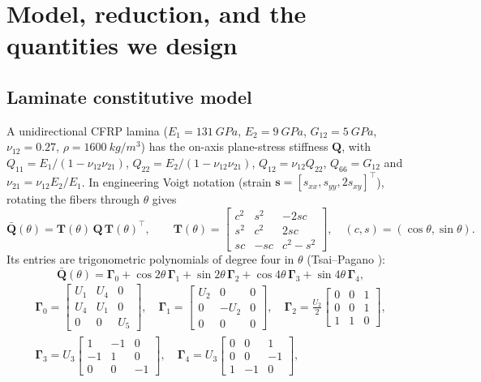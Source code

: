 \section{Model, reduction, and the quantities we design}\label{sec:model}

\subsection{Laminate constitutive model}\label{sec:clt}
A unidirectional CFRP lamina ($E_1=\SI{131}{GPa}$, $E_2=\SI{9}{GPa}$,
$G_{12}=\SI{5}{GPa}$, $\nu_{12}=0.27$, $\rho=\SI{1600}{kg/m^3}$) has the on-axis
plane-stress stiffness $\bm Q$, with $Q_{11}=E_1/(1-\nu_{12}\nu_{21})$,
$Q_{22}=E_2/(1-\nu_{12}\nu_{21})$, $Q_{12}=\nu_{12}Q_{22}$, $Q_{66}=G_{12}$ and
$\nu_{21}=\nu_{12}E_2/E_1$. In engineering Voigt notation (strain
$\bm s=[s_{xx},s_{yy},2s_{xy}]^{\!\top}$), rotating the fibers through $\theta$ gives
\begin{equation}
\bar{\bm Q}(\theta)=\bm T(\theta)\,\bm Q\,\bm T(\theta)^{\!\top},\qquad
\bm T(\theta)=\begin{bmatrix}c^2&s^2&-2sc\\ s^2&c^2&2sc\\ sc&-sc&c^2-s^2\end{bmatrix},
\quad (c,s)=(\cos\theta,\sin\theta).
\label{eq:rot}
\end{equation}
Its entries are trigonometric polynomials of degree four in $\theta$ (Tsai--Pagano \cite{tsai1968}):
\begin{equation}
\bar{\bm Q}(\theta)=\bm\Gamma_0+\cos2\theta\,\bm\Gamma_1+\sin2\theta\,\bm\Gamma_2
+\cos4\theta\,\bm\Gamma_3+\sin4\theta\,\bm\Gamma_4,
\label{eq:qbar}
\end{equation}
\begin{gather*}
\bm\Gamma_0=\begin{bmatrix}U_1&U_4&0\\U_4&U_1&0\\0&0&U_5\end{bmatrix},\quad
\bm\Gamma_1=\begin{bmatrix}U_2&0&0\\0&-U_2&0\\0&0&0\end{bmatrix},\quad
\bm\Gamma_2=\tfrac{U_2}{2}\begin{bmatrix}0&0&1\\0&0&1\\1&1&0\end{bmatrix},\\
\bm\Gamma_3=U_3\begin{bmatrix}1&-1&0\\-1&1&0\\0&0&-1\end{bmatrix},\quad
\bm\Gamma_4=U_3\begin{bmatrix}0&0&1\\0&0&-1\\1&-1&0\end{bmatrix},
\end{gather*}
